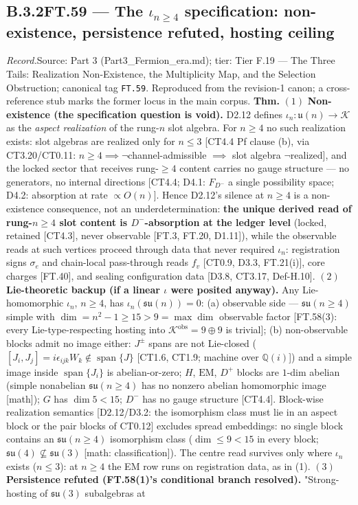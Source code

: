 \documentclass[11pt,openany]{report}
\theoremstyle{canonplain}
\theoremstyle{canondef}
\begin{document}
\medskip
\subsection*{\texorpdfstring{B.3.2\quad FT.59 — The $\iota_{n\ge4}$ specification: non-existence, persistence refuted, hosting ceiling}{FT.59 B.3.2}}
\label{tag:FT-59}
{\small \textit{Record.}\quad Source: Part 3 (Part3\_Fermion\_era.md); tier: Tier F.19 — The Three Tails: Realization Non-Existence, the Multiplicity Map, and the Selection Obstruction; canonical tag \texttt{FT.59}. Reproduced from the revision-1 canon; a cross-reference stub marks the former locus in the main corpus.}
\medskip
\textbf{Thm.} $(1)$ \textbf{Non-existence (the specification question is void).} D2.12 defines $\iota_n:\mathfrak u(n)\to\mathcal K$ as the \textit{aspect realization} of the rung-$n$ slot algebra. For $n\ge4$ no such realization exists: slot algebras are realized only for $n\le3$ [CT4.4 Pf clause (b), via CT3.20/CT0.11: $n\ge4\implies\neg$channel-admissible $\implies$ slot algebra $\neg$realized], and the locked sector that receives rung-$\ge4$ content carries no gauge structure — no generators, no internal directions [CT4.4; D4.1: $F_{D^-}$ a single possibility space; D4.2: absorption at rate $\propto O(n)$]. Hence D2.12's silence at $n\ge4$ is a non-existence consequence, not an underdetermination: \textbf{the unique derived read of rung-$n\ge4$ slot content is $D^-$-absorption at the ledger level} (locked, retained [CT4.3], never observable [FT.3, FT.20, D1.11]), while the observable reads at such vertices proceed through data that never required $\iota_n$: registration signs $\sigma_e$ and chain-local pass-through reads $f_v$ [CT0.9, D3.3, FT.21(i)], core charges [FT.40], and sealing configuration data [D3.8, CT3.17, Def-H.10]. $(2)$ \textbf{Lie-theoretic backup (if a linear $\iota$ were posited anyway).} Any Lie-homomorphic $\iota_n$, $n\ge4$, has $\iota_n(\mathfrak{su}(n))=0$: (a) observable side — $\mathfrak{su}(n\ge4)$ simple with $\dim=n^2-1\ge15>9=\max\dim$ observable factor [FT.58(3): every Lie-type-respecting hosting into $\mathcal K^{\mathrm{obs}}=9\oplus9$ is trivial]; (b) non-observable blocks admit no image either: $J^\pm$ spans are not Lie-closed ($[J_i,J_j]=i\epsilon_{ijk}W_k\notin\operatorname{span}\{J\}$ [CT1.6, CT1.9; machine over $\mathbb Q(i)$]) and a simple image inside $\operatorname{span}\{J_i\}$ is abelian-or-zero; $H$, $\mathrm{EM}$, $D^+$ blocks are $1$-dim abelian (simple nonabelian $\mathfrak{su}(n\ge4)$ has no nonzero abelian homomorphic image [math]); $G$ has $\dim5<15$; $D^-$ has no gauge structure [CT4.4]. Block-wise realization semantics [D2.12/D3.2: the isomorphism class must lie in an aspect block or the pair blocks of CT0.12] excludes spread embeddings: no single block contains an $\mathfrak{su}(n\ge4)$ isomorphism class ($\dim\le9<15$ in every block; $\mathfrak{su}(4)\not\subseteq\mathfrak{su}(3)$ [math: classification]). The centre read survives only where $\iota_n$ exists ($n\le3$): at $n\ge4$ the EM row runs on registration data, as in (1). $(3)$ \textbf{Persistence refuted (FT.58(1)'s conditional branch resolved).} "Strong-hosting of $\mathfrak{su}(3)$ subalgebras at 
\end{document}
